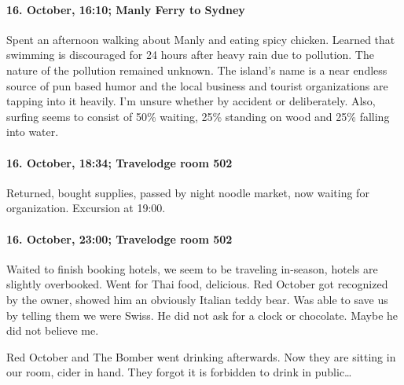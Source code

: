 \paragraph{16. October, 16:10; Manly Ferry to Sydney}
Spent an afternoon walking about Manly and eating spicy chicken.
Learned that swimming is discouraged for 24 hours after heavy rain due to pollution.
The nature of the pollution remained unknown.
The island's name is a near endless source of pun based humor and the local business and tourist organizations are tapping into it heavily.
I'm unsure whether by accident or deliberately.
Also, surfing seems to consist of 50\% waiting, 25\% standing on wood and 25\% falling into water.

\paragraph{16. October, 18:34; Travelodge room 502}
Returned, bought supplies, passed by night noodle market, now waiting for organization.
Excursion at 19:00.

\paragraph{16. October, 23:00; Travelodge room 502}
Waited to finish booking hotels, we seem to be traveling in-season, hotels are slightly overbooked.
Went for Thai food, delicious.
Red October got recognized by the owner, showed him an obviously Italian teddy bear.
Was able to save us by telling them we were Swiss.
He did not ask for a clock or chocolate.
Maybe he did not believe me.

Red October and The Bomber went drinking afterwards.
Now they are sitting in our room, cider in hand.
They forgot it is forbidden to drink in public\ldots{}
